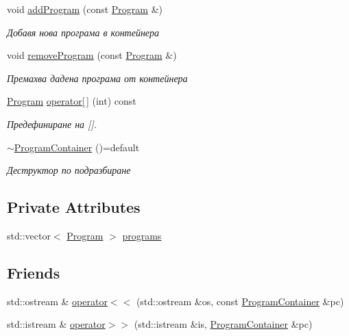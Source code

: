 \begin{DoxyCompactItemize}
void \hyperlink{class_program_container_a9328196abac3c41551714de458faa75a}{add\+Program} (const \hyperlink{class_program}{Program} \&)
\begin{DoxyCompactList}\small\item\em Добавя нова програма в контейнера \end{DoxyCompactList}\item 
void \hyperlink{class_program_container_a856d6d075c9fc8410d2f5c7dbd915f7f}{remove\+Program} (const \hyperlink{class_program}{Program} \&)
\begin{DoxyCompactList}\small\item\em Премахва дадена програма от контейнера \end{DoxyCompactList}\item 
\hyperlink{class_program}{Program} \hyperlink{class_program_container_aa9c5c2ef50338c70e82d36b058f2c202}{operator\mbox{[}$\,$\mbox{]}} (int) const
\begin{DoxyCompactList}\small\item\em Предефиниране на \mbox{[}\mbox{]}. \end{DoxyCompactList}\item 
\hyperlink{class_program_container_aa60717707c10a8be7c1da4b36f78a88f}{$\sim$\+Program\+Container} ()=default
\begin{DoxyCompactList}\small\item\em Деструктор по подразбиране \end{DoxyCompactList}\end{DoxyCompactItemize}
\subsection*{Private Attributes}
\begin{DoxyCompactItemize}
\item 
std\+::vector$<$ \hyperlink{class_program}{Program} $>$ \hyperlink{class_program_container_a48acf6026a06116cff5ad8ec86e7a6ce}{programs}
\end{DoxyCompactItemize}
\subsection*{Friends}
\begin{DoxyCompactItemize}
\item 
std\+::ostream \& \hyperlink{class_program_container_a31b13ec661243c3ed004670c91e584c7}{operator$<$$<$} (std\+::ostream \&os, const \hyperlink{class_program_container}{Program\+Container} \&pc)
\item 
std\+::istream \& \hyperlink{class_program_container_aa1143040c52e764c64a503d1b09fe8d2}{operator$>$$>$} (std\+::istream \&is, \hyperlink{class_program_container}{Program\+Container} \&pc)
\end{DoxyCompactItemize}


